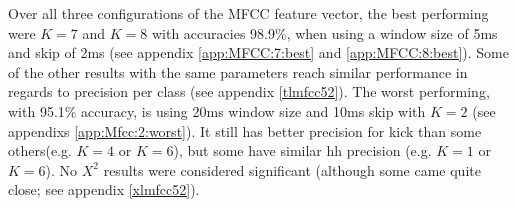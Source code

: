 %			
		
		Over all three configurations of the MFCC feature vector, the best performing were $K=7$ and $K=8$ with accuracies 98.9\%, when using a window size of 5ms and skip of 2ms (see appendix \ref{app:MFCC:7:best} and \ref{app:MFCC:8:best}). Some of the other results with the same parameters reach similar performance in regards to precision per class (see appendix \ref{tlmfcc52}). The worst performing, with 95.1\% accuracy, is using 20ms window size and 10ms skip with $K=2$ (see appendixs \ref{app:Mfcc:2:worst}). It still has better precision for kick than some others(e.g. $K=4$ or $K=6$), but some have similar hh precision (e.g. $K=1$ or $K=6$). No $X^2$ results were considered significant (although some came quite close; see appendix \ref{xlmfcc52}).
		

